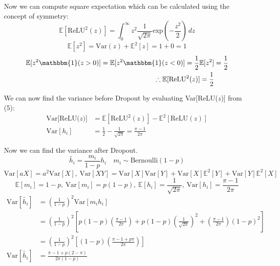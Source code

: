 \documentclass{article}
\begin{document}
{Now we can compute square expectation which can be calculated using the concept of symmetry:
\begin{equation}
    \mathbb{E}[\text{ReLU}^2(z)] = \int_{0}^{\infty} z^2  \frac{1}{\sqrt{2 \pi}} \text{exp}(-\frac{z^2}{2}) \,dz 
\end{equation}
\begin{equation}
    \mathbb{E}[z^2] = \text{Var}(z)+ \mathbb{E}^2[z]= 1+0=1
\end{equation}
\begin{equation}
\begin{aligned}
    \mathbb{E}[z^2  \mathbbm{1}(z>0)]= \mathbb{E}[z^2  \mathbbm{1}(z<0)]= \frac{1}{2} \mathbb{E}[z^2]&= \frac{1}{2}\\
    \therefore \mathbb{E}[\text{ReLU}^2(z)]= \frac{1}{2}
\end{aligned}
\end{equation}

We can now find the variance before Dropout by evaluating Var[ReLU($z$)] from (5):
\begin{equation}
\begin{aligned}
    \text{Var[ReLU($z$)]}&= \mathbb{E}[\text{ReLU}^2(z)]- \mathbb{E}^2[\text{ReLU}(z)] \\
    \text{Var}[h_i]&= \frac{1}{2}- \frac{1}{\sqrt{2 \pi}}= \frac{\pi-1}{2 \pi}
\end{aligned}
\end{equation}

Now we can find the variance after Dropout.
\begin{equation}
    \tilde{h_i}= \frac{m_i}{1-p}h_i \quad m_i \sim \text{Bernoulli}(1-p)
\end{equation}
\begin{equation}
    \text{Var}[aX]= a^2\text{Var}[X], \ \text{Var}[XY] = \text{Var}[X] \text{Var}[Y]+ \text{Var}[X] \mathbb{E}^2[Y]+ \text{Var}[Y] \mathbb{E}^2[X]
\end{equation}
\begin{equation}
    \mathbb{E}[m_i]=1-p, \ \text{Var}[m_i]=p(1-p), \ \mathbb{E}[h_i]= \frac{1}{\sqrt{2 \pi}}, \ \text{Var}[h_i]=\frac{\pi -1}{2 \pi}
\end{equation}
\begin{equation}
\begin{aligned}
    \text{Var}[\tilde{h_i}]&= (\frac{1}{1-p})^2 \text{Var}[m_ih_i]\\
    &= (\frac{1}{1-p})^2 [p(1-p)(\frac{\pi -1}{2 \pi})+p(1-p)(\frac{1}{\sqrt{2 \pi}})^2+(\frac{\pi -1}{2 \pi})(1-p)^2]\\
    &= (\frac{1}{1-p})^2[(1-p)(\frac{\pi -1+p \pi}{2 \pi})]\\
    \text{Var}[\tilde{h_i}]&= \frac{\pi -1+p(2- \pi)}{2 \pi (1-p)}
\end{aligned}
\end{equation}
}
\end{document}

